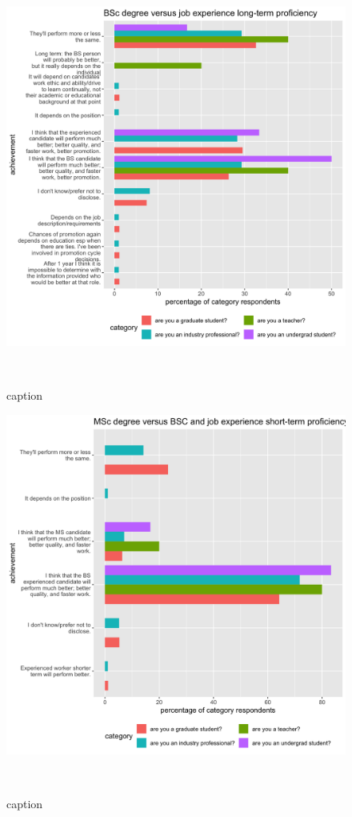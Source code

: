 \documentclass{sigchi}
\begin{document}
\begin{figure}
\includegraphics[scale=0.2]{../data-analysis/plots_output/BSc_degree_versus_job_experience_long-term_proficiency.png}
 \caption{caption}~\label{fig:figure9}
\end{figure}

\begin{figure}
\includegraphics[scale=0.2]{../data-analysis/plots_output/MSc_degree_versus_BSC_and_job_experience_short-term_proficiency.png}
 \caption{caption}~\label{fig:figure10}
\end{figure}
\end{document}
